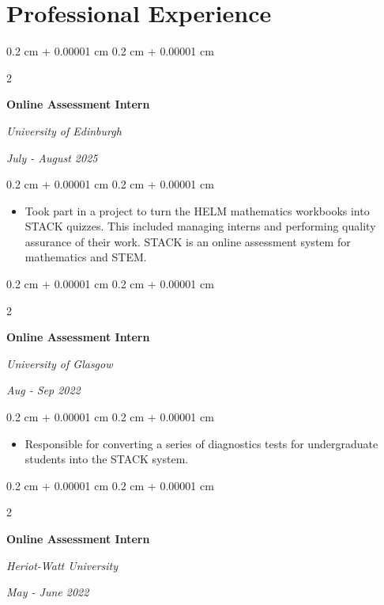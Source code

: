 \documentclass[10pt, letterpaper]{article}
\newenvironment{highlights}{
    \begin{itemize}[
        topsep=0.10 cm,
        parsep=0.10 cm,
        partopsep=0pt,
        itemsep=0pt,
        leftmargin=0.4 cm + 10pt
    ]
}{
    \end{itemize}
} %
\newenvironment{onecolentry}{
    \begin{adjustwidth}{
        0.2 cm + 0.00001 cm
    }{
        0.2 cm + 0.00001 cm
    }
}{
    \end{adjustwidth}
} %
\newenvironment{twocolentry}[2][]{
    \onecolentry
    \def\secondColumn{#2}
    \setcolumnwidth{\fill, 4.5 cm}
    \begin{paracol}{2}
}{
    \switchcolumn \raggedleft \secondColumn
    \end{paracol}
    \endonecolentry
} %
\begin{document}
    \section{Professional Experience}
    
        \begin{twocolentry}{
        \textit{July - August 2025}}
            \textbf{Online Assessment Intern}
            
            \textit{University of Edinburgh}
        \end{twocolentry}
        \vspace{0.10 cm}
        \begin{onecolentry}
            \begin{highlights}
                \item Took part in a project to turn the HELM mathematics workbooks into STACK quizzes. This included managing interns and performing quality assurance of their work. STACK is an online assessment system for mathematics and STEM.
            \end{highlights}
        \end{onecolentry}
\vspace{0.2 cm}

        \begin{twocolentry}{
        \textit{Aug - Sep 2022}}
            \textbf{Online Assessment Intern}
            
            \textit{University of Glasgow}
        \end{twocolentry}

        \vspace{0.10 cm}
        \begin{onecolentry}
            \begin{highlights}
                \item Responsible for converting a series of diagnostics tests for undergraduate students into the STACK system.
            \end{highlights}
        \end{onecolentry}

        \vspace{0.2 cm}

        \begin{twocolentry}{
        \textit{May - June 2022}}
            \textbf{Online Assessment Intern}
            
            \textit{Heriot-Watt University}
        \end{twocolentry}
\end{document}
